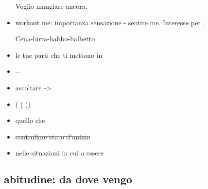 \begin{itemize}
Voglio mangiare ancora.

\item workout me: importanza sensazione - sentire me. Interesse per .

Cena-birra-babbo-balbetto

\item le tue parti che ti mettono in 

\item {}--

\item ascoltare -> 

\item ( ( ))

\item quello che 

\item \sout{controllare stato d’animo} 

\item nelle situazioni in cui  a essere

\end{itemize}

\subsection{abitudine: da dove vengo}

